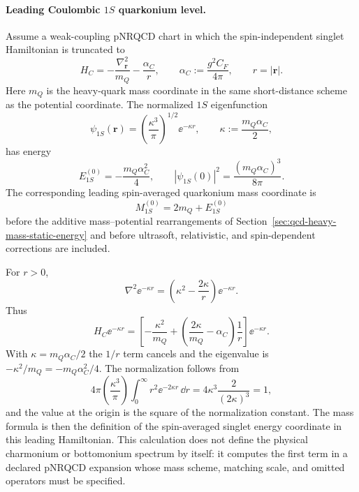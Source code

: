 \paragraph{Leading Coulombic \(1S\) quarkonium level.}
Assume a weak-coupling pNRQCD chart in which the spin-independent singlet
Hamiltonian is truncated to
\begin{equation}
  H_C
  =
  -\frac{\nabla_{\mathbf r}^2}{m_Q}
  -\frac{\alpha_C}{r},
  \qquad
  \alpha_C:=\frac{g^2C_F}{4\pi},
  \qquad r=|\mathbf r|.
  \label{eq:qcd-coulombic-pnrqcd-hamiltonian}
\end{equation}
Here \(m_Q\) is the heavy-quark mass coordinate in the same short-distance
scheme as the potential coordinate.  The normalized \(1S\) eigenfunction
\begin{equation}
  \psi_{1S}(\mathbf r)
  =
  \left(\frac{\kappa^3}{\pi}\right)^{1/2}\ee^{-\kappa r},
  \qquad
  \kappa:=\frac{m_Q\alpha_C}{2},
  \label{eq:qcd-coulombic-one-s-wavefunction}
\end{equation}
has energy
\begin{equation}
  E_{1S}^{(0)}
  =
  -\frac{m_Q\alpha_C^2}{4},
  \qquad
  |\psi_{1S}(0)|^2=
  \frac{(m_Q\alpha_C)^3}{8\pi}.
  \label{eq:qcd-coulombic-one-s-energy-origin}
\end{equation}
The corresponding leading spin-averaged quarkonium mass coordinate is
\[
  M_{1S}^{(0)}=2m_Q+E_{1S}^{(0)}
\]
before the additive mass--potential rearrangements of
Section~\ref{sec:qcd-heavy-mass-static-energy} and before ultrasoft,
relativistic, and spin-dependent corrections are included.

For \(r>0\),
\[
  \nabla^2\ee^{-\kappa r}
  =
  \left(\kappa^2-\frac{2\kappa}{r}\right)\ee^{-\kappa r}.
\]
Thus
\[
  H_C\ee^{-\kappa r}
  =
  \left[
    -\frac{\kappa^2}{m_Q}
    +
    \left(\frac{2\kappa}{m_Q}-\alpha_C\right)\frac1r
  \right]\ee^{-\kappa r}.
\]
With \(\kappa=m_Q\alpha_C/2\) the \(1/r\) term cancels and the eigenvalue is
\(-\kappa^2/m_Q=-m_Q\alpha_C^2/4\).  The normalization follows from
\[
  4\pi
  \left(\frac{\kappa^3}{\pi}\right)
  \int_0^\infty r^2\ee^{-2\kappa r}\,\dd r
  =
  4\kappa^3\frac{2}{(2\kappa)^3}=1,
\]
and the value at the origin is the square of the normalization constant.
The mass formula is then the definition of the spin-averaged singlet energy
coordinate in this leading Hamiltonian.  This calculation does not define the
physical charmonium or bottomonium spectrum by itself: it computes the first
term in a declared pNRQCD expansion whose mass scheme, matching scale, and
omitted operators must be specified.

